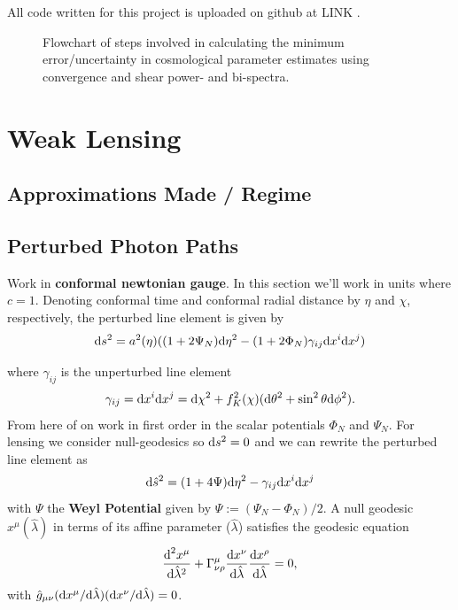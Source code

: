 \documentclass[11pt]{article} %
\DeclareRobustCommand{\d}{\ifmmode\text{d}\else d\fi}
\begin{document}
All code written for this project is uploaded on github at LINK .



\begin{figure}[h!]
    \centering
    
    \caption{Flowchart of steps involved in calculating the minimum error/uncertainty in cosmological parameter estimates using convergence and shear power- and bi-spectra.}
    \label{fig:flowchart}
\end{figure}

\section{Weak Lensing}\label{sec:weaklensing}
\subsection{Approximations Made / Regime}
\subsection{Perturbed Photon Paths}
Work in \textbf{conformal newtonian gauge}. In this section we'll work in units where $c=1$. Denoting conformal time and conformal radial distance by $\eta$ and $\chi$, respectively, the perturbed line element is given by
\begin{equation}
    \d s^2 = a^2(\eta)((1 + 2\Psi_N) \d \eta^2 - (1 + 2\Phi_N) \gamma_{ij}\d x^i \d x^j) 
\end{equation}

where $\gamma_{ij}$ is the unperturbed line element
\begin{equation}
    \gamma_{ij} = \d x^i \d x^j = \d \chi^2 + f^2_K(\chi)(\d \theta^2 + \sin ^2 \theta \d \phi ^2).
\end{equation}
From here of on work in first order in the scalar potentials $\Phi_N$ and $\Psi_N$. For lensing we consider null-geodesics so $\d s^2 = 0$ and we can rewrite the perturbed line element as
\begin{equation}
    \d \hat s^2 = (1 + 4\Psi)\d\eta^2 - \gamma_{ij} \d x^i \d x^j
\end{equation}
with $\Psi$ the \textbf{Weyl Potential} given by $\Psi := (\Psi_N - \Phi_N)/2$. A null geodesic $x^\mu(\hat\lambda)$ in terms of its affine parameter ($\hat \lambda$) satisfies the geodesic equation
\begin{equation}
    \frac{\d^2 x^\mu}{\d \hat\lambda^2} + \Gamma^\mu_{\nu\rho} \frac{\d x^\nu}{\d \hat\lambda}\frac{\d x^\rho}{\d\hat\lambda} = 0,
\end{equation}
with $\hat g_{\mu\nu}(\d x^\mu/\d \hat\lambda)(\d x^\nu / \d \hat \lambda) = 0$. 
\end{document}
